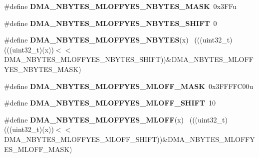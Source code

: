 \begin{DoxyCompactItemize}
\item 
\hypertarget{group___d_m_a___register___masks_ga83bbf68562a7ac3e45fb940a1a7f18f8}{}\#define {\bfseries D\+M\+A\+\_\+\+N\+B\+Y\+T\+E\+S\+\_\+\+M\+L\+O\+F\+F\+Y\+E\+S\+\_\+\+N\+B\+Y\+T\+E\+S\+\_\+\+M\+A\+S\+K}~0x3\+F\+Fu\label{group___d_m_a___register___masks_ga83bbf68562a7ac3e45fb940a1a7f18f8}

\item 
\hypertarget{group___d_m_a___register___masks_ga30c39f4b863f96ab4563e05480f0c63e}{}\#define {\bfseries D\+M\+A\+\_\+\+N\+B\+Y\+T\+E\+S\+\_\+\+M\+L\+O\+F\+F\+Y\+E\+S\+\_\+\+N\+B\+Y\+T\+E\+S\+\_\+\+S\+H\+I\+F\+T}~0\label{group___d_m_a___register___masks_ga30c39f4b863f96ab4563e05480f0c63e}

\item 
\hypertarget{group___d_m_a___register___masks_ga5acdf59d6e2907449a082bdc3ef9d9d1}{}\#define {\bfseries D\+M\+A\+\_\+\+N\+B\+Y\+T\+E\+S\+\_\+\+M\+L\+O\+F\+F\+Y\+E\+S\+\_\+\+N\+B\+Y\+T\+E\+S}(x)                    ~(((uint32\+\_\+t)(((uint32\+\_\+t)(x))$<$$<$D\+M\+A\+\_\+\+N\+B\+Y\+T\+E\+S\+\_\+\+M\+L\+O\+F\+F\+Y\+E\+S\+\_\+\+N\+B\+Y\+T\+E\+S\+\_\+\+S\+H\+I\+F\+T))\&D\+M\+A\+\_\+\+N\+B\+Y\+T\+E\+S\+\_\+\+M\+L\+O\+F\+F\+Y\+E\+S\+\_\+\+N\+B\+Y\+T\+E\+S\+\_\+\+M\+A\+S\+K)\label{group___d_m_a___register___masks_ga5acdf59d6e2907449a082bdc3ef9d9d1}

\item 
\hypertarget{group___d_m_a___register___masks_gac07412f8b58bca6703cf427a9ce2bbcb}{}\#define {\bfseries D\+M\+A\+\_\+\+N\+B\+Y\+T\+E\+S\+\_\+\+M\+L\+O\+F\+F\+Y\+E\+S\+\_\+\+M\+L\+O\+F\+F\+\_\+\+M\+A\+S\+K}~0x3\+F\+F\+F\+F\+C00u\label{group___d_m_a___register___masks_gac07412f8b58bca6703cf427a9ce2bbcb}

\item 
\hypertarget{group___d_m_a___register___masks_gaeebd8fdf6a54f6511b5bc65a6b139545}{}\#define {\bfseries D\+M\+A\+\_\+\+N\+B\+Y\+T\+E\+S\+\_\+\+M\+L\+O\+F\+F\+Y\+E\+S\+\_\+\+M\+L\+O\+F\+F\+\_\+\+S\+H\+I\+F\+T}~10\label{group___d_m_a___register___masks_gaeebd8fdf6a54f6511b5bc65a6b139545}

\item 
\hypertarget{group___d_m_a___register___masks_gab72ec1c376e33d876146208acd4ff1d0}{}\#define {\bfseries D\+M\+A\+\_\+\+N\+B\+Y\+T\+E\+S\+\_\+\+M\+L\+O\+F\+F\+Y\+E\+S\+\_\+\+M\+L\+O\+F\+F}(x)                      ~(((uint32\+\_\+t)(((uint32\+\_\+t)(x))$<$$<$D\+M\+A\+\_\+\+N\+B\+Y\+T\+E\+S\+\_\+\+M\+L\+O\+F\+F\+Y\+E\+S\+\_\+\+M\+L\+O\+F\+F\+\_\+\+S\+H\+I\+F\+T))\&D\+M\+A\+\_\+\+N\+B\+Y\+T\+E\+S\+\_\+\+M\+L\+O\+F\+F\+Y\+E\+S\+\_\+\+M\+L\+O\+F\+F\+\_\+\+M\+A\+S\+K)\label{group___d_m_a___register___masks_gab72ec1c376e33d876146208acd4ff1d0}


\end{DoxyCompactItemize}
